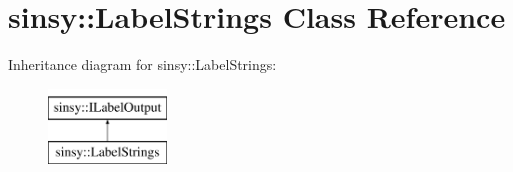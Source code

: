\hypertarget{classsinsy_1_1LabelStrings}{\section{sinsy\-:\-:\-Label\-Strings \-Class \-Reference}
\label{classsinsy_1_1LabelStrings}
}
\-Inheritance diagram for sinsy\-:\-:\-Label\-Strings\-:\begin{figure}[H]
\begin{center}
\leavevmode
\includegraphics[height=2.000000cm]{classsinsy_1_1LabelStrings}
\end{center}
\end{figure}

